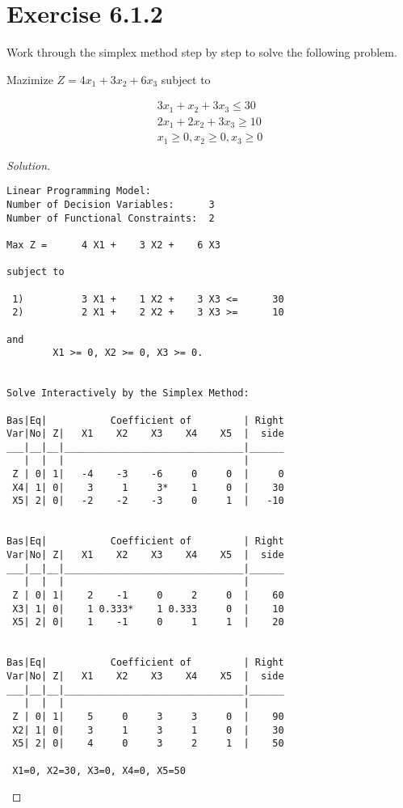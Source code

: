 \documentclass[titlepage, letterpaper, fleqn]{article}
\newcommand{\spacepls}{\vspace{5mm}}
\renewcommand\qedsymbol{\(\blacksquare\)}
\newenvironment{solution}
{\renewcommand\qedsymbol{$\square$}\begin{proof}[Solution]}
{\end{proof}}
\begin{document}
\spacepls

\section{Exercise 6.1.2}

{\large Work through the simplex method step by step to solve the following problem.

Mazimize $Z = 4x_1 + 3x_2 + 6x_3$ subject to}

\begin{align*}
3x_1 + x_2 + 3x_3 \leq 30 \\
2x_1 + 2x_2 + 3x_3 \geq 10 \\
x_1  \geq 0, x_2 \geq 0, x_3 \geq 0
\end{align*}

\begin{solution}
\begin{lstlisting}[basicstyle=\tiny]
Linear Programming Model:
Number of Decision Variables:      3
Number of Functional Constraints:  2

Max Z =      4 X1 +    3 X2 +    6 X3 

subject to

 1)          3 X1 +    1 X2 +    3 X3 <=      30
 2)          2 X1 +    2 X2 +    3 X3 >=      10

and
        X1 >= 0, X2 >= 0, X3 >= 0.


Solve Interactively by the Simplex Method:

Bas|Eq|           Coefficient of         | Right
Var|No| Z|   X1    X2    X3    X4    X5  |  side
___|__|__|_______________________________|______
   |  |  |                               | 
 Z | 0| 1|   -4    -3    -6     0     0  |     0
 X4| 1| 0|    3     1     3*    1     0  |    30
 X5| 2| 0|   -2    -2    -3     0     1  |   -10


Bas|Eq|           Coefficient of         | Right
Var|No| Z|   X1    X2    X3    X4    X5  |  side
___|__|__|_______________________________|______
   |  |  |                               | 
 Z | 0| 1|    2    -1     0     2     0  |    60
 X3| 1| 0|    1 0.333*    1 0.333     0  |    10
 X5| 2| 0|    1    -1     0     1     1  |    20


Bas|Eq|           Coefficient of         | Right
Var|No| Z|   X1    X2    X3    X4    X5  |  side
___|__|__|_______________________________|______
   |  |  |                               | 
 Z | 0| 1|    5     0     3     3     0  |    90
 X2| 1| 0|    3     1     3     1     0  |    30
 X5| 2| 0|    4     0     3     2     1  |    50

 X1=0, X2=30, X3=0, X4=0, X5=50
\end{lstlisting}
\end{solution}
\end{document}
